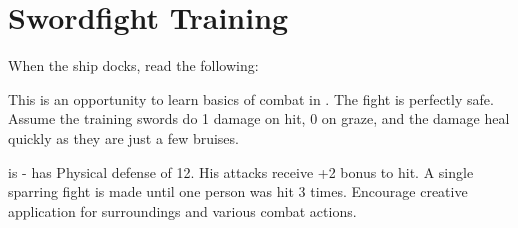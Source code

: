 \section{Swordfight Training}

When the ship docks, read the following:


This is an opportunity to learn basics of combat in \cosmereRPG{}. The fight is perfectly safe. Assume the training swords do 1 damage on hit, 0 on graze, and the damage heal quickly as they are just a few bruises.

\npcShinCaptain{} is \enemyExpert{} - has Physical defense of 12. His attacks receive +2 bonus to hit. A single sparring fight is made until one person was hit 3 times. Encourage creative application for surroundings and various combat actions.
